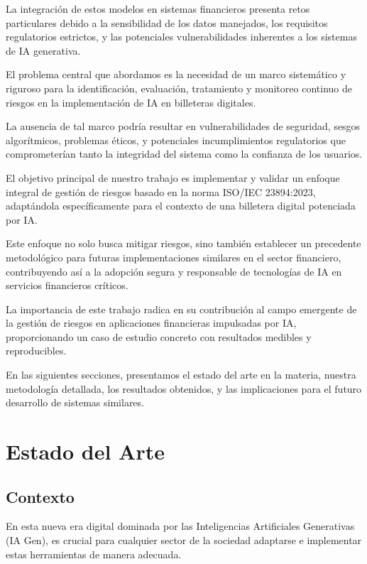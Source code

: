 \documentclass[12pt]{article}
\begin{document}
La integración de estos modelos en sistemas financieros presenta retos particulares debido a la sensibilidad de los datos manejados, los requisitos regulatorios estrictos, y las potenciales vulnerabilidades inherentes a los sistemas de IA generativa.

El problema central que abordamos es la necesidad de un marco sistemático y riguroso para la identificación, evaluación, tratamiento y monitoreo continuo de riesgos en la implementación de IA en billeteras digitales. 

La ausencia de tal marco podría resultar en vulnerabilidades de seguridad, sesgos algorítmicos, problemas éticos, y potenciales incumplimientos regulatorios que comprometerían tanto la integridad del sistema como la confianza de los usuarios.

El objetivo principal de nuestro trabajo es implementar y validar un enfoque integral de gestión de riesgos basado en la norma ISO/IEC 23894:2023, adaptándola específicamente para el contexto de una billetera digital potenciada por IA. 

Este enfoque no solo busca mitigar riesgos, sino también establecer un precedente metodológico para futuras implementaciones similares en el sector financiero, contribuyendo así a la adopción segura y responsable de tecnologías de IA en servicios financieros críticos.

La importancia de este trabajo radica en su contribución al campo emergente de la gestión de riesgos en aplicaciones financieras impulsadas por IA, proporcionando un caso de estudio concreto con resultados medibles y reproducibles. 

En las siguientes secciones, presentamos el estado del arte en la materia, nuestra metodología detallada, los resultados obtenidos, y las implicaciones para el futuro desarrollo de sistemas similares.

\section{Estado del Arte}
\label{sec:estado_arte}

\subsection{Contexto}
En esta nueva era digital dominada por las Inteligencias Artificiales Generativas (IA Gen), 
es crucial para cualquier sector de la sociedad adaptarse e implementar estas herramientas de manera adecuada. 
\end{document}
